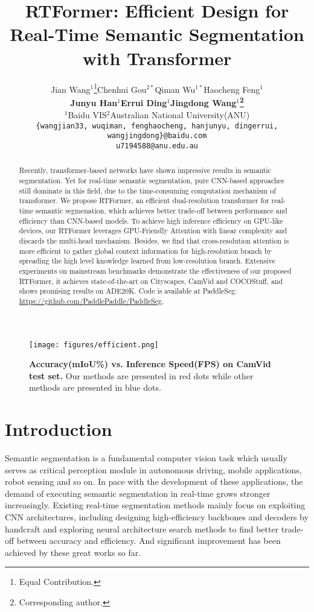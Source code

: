 \documentclass{article}
\title{RTFormer: Efficient Design for Real-Time Semantic Segmentation with Transformer}
\author{Jian Wang$^1$\thanks{Equal Contribution.}\quad Chenhui Gou$^{2\ast}$\quad Qiman Wu$^{1\ast}$\quad Haocheng Feng$^1$\\
\textbf{Junyu Han$^1$\quad Errui Ding$^1$\quad Jingdong Wang$^1$\thanks{Corresponding author.}}\\
$^1$Baidu VIS\quad $^2$Australian National University(ANU)\\
\texttt{\{wangjian33, wuqiman, fenghaocheng, hanjunyu, dingerrui, wangjingdong\}@baidu.com}\\
\texttt{u7194588@anu.edu.au}\\
}
\begin{document}
\maketitle

\begin{abstract}
  
Recently, transformer-based networks have shown impressive results in semantic segmentation. Yet for real-time semantic segmentation, pure CNN-based approaches still dominate in this field, due to the time-consuming computation mechanism of transformer. We propose RTFormer, an efficient dual-resolution transformer for real-time semantic segmenation, which achieves better trade-off between performance and efficiency than CNN-based models. To achieve high inference efficiency on GPU-like devices, our RTFormer leverages GPU-Friendly Attention with linear complexity and discards the multi-head mechanism. Besides, we find that cross-resolution attention is more efficient to gather global context information for high-resolution branch by spreading the high level knowledge learned from low-resolution branch. Extensive experiments on mainstream benchmarks demonstrate the effectiveness of our proposed RTFormer, it achieves state-of-the-art on Cityscapes, CamVid and COCOStuff, and shows promising results on ADE20K. Code is available at PaddleSeg\cite{liu2021paddleseg}: \href{https://github.com/PaddlePaddle/PaddleSeg}{https://github.com/PaddlePaddle/PaddleSeg}.

\end{abstract}

\begin{wrapfigure}[17]{r}{6cm}
\centering
\texttt{[image: figures/efficient.png]}
\caption{\textbf{Accuracy(mIoU\%) vs. Inference Speed(FPS) on CamVid\cite{CamVid} test set.} Our methods are presented in red dots while other methods are presented in blue dots.}
\label{fig:intro}
\end{wrapfigure}

\section{Introduction}

Semantic segmentation is a fundamental computer vision task which usually serves as critical perception module in autonomous driving, mobile applications, robot sensing and so on. In pace with the development of these applications, the demand of executing semantic segmentation in real-time grows stronger increasingly. Existing real-time segmentation methods mainly focus on exploiting CNN architectures, including designing high-efficiency backbones and decoders\cite{zhao2018icnet, yu2018bisenet, yu2021bisenet, hong2021deep, li2020semantic, fan2021rethinking, chao2019hardnet, orvsic2021efficient} by handcraft and exploring neural architecture search methods to find better trade-off between accuracy and efficiency\cite{zhang2019customizable, lin2020graph, li2019partial, chen2019fasterseg}. And significant improvement has been achieved by these great works so far.
\end{document}
